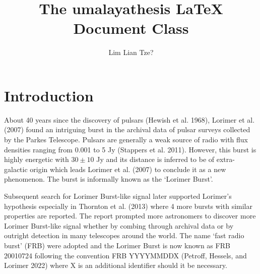 \documentclass[english,singlespacedlisttitles]{umalayathesis}
\author{Lim Lian Tze?}
\title{The umalayathesis \LaTeX{} Document Class}
\begin{document}
\frontmatter

\makecoverandtitlepage{\doctoralresearch}


{\clearpage
\tableofcontents\clearpage
\listoffigures\clearpage
\listoftables\clearpage



\listofacronyms\clearpage
\listofappendices\clearpage}

\mainmatter
{}

\hypertarget{introduction}{%
\chapter{Introduction}\label{introduction}}

About 40 years since the discovery of pulsars (Hewish et al. 1968),
Lorimer et al. (2007) found an intriguing burst in the archival data of
pulsar surveys collected by the Parkes Telescope. Pulsars are generally
a weak source of radio with flux densities ranging from 0.001 to 5 Jy
(Stappers et al. 2011). However, this burst is highly energetic with
\(30\pm 10\) Jy and its distance is inferred to be of extra-galactic
origin which leads Lorimer et al. (2007) to conclude it as a new
phenomenon. The burst is informally known as the `Lorimer Burst'.

Subsequent search for Lorimer Burst-like signal later supported
Lorimer's hypothesis especially in Thornton et al. (2013) where 4 more
bursts with similar properties are reported. The report prompted more
astronomers to discover more Lorimer Burst-like signal whether by
combing through archival data or by outright detection in many
telescopes around the world. The name `fast radio burst' (FRB) were
adopted and the Lorimer Burst is now known as FRB 20010724 following the
convention FRB YYYYMMDDX (Petroff, Hessels, and Lorimer 2022) where X is
an additional identifier should it be necessary.
\end{document}
